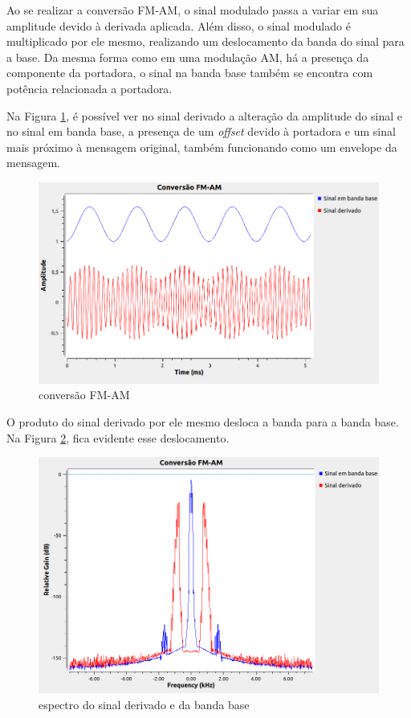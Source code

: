 Ao se realizar a conversão FM-AM, o sinal modulado passa a variar em sua amplitude devido à derivada aplicada. Além disso, o sinal modulado é multiplicado por ele mesmo, realizando um deslocamento da banda do sinal para a base. Da mesma forma como em uma modulação AM, há a presença da componente da portadora, o sinal na banda base também se encontra com potência relacionada a portadora.

Na Figura \ref{fig:resul_03}, é possível ver no sinal derivado a alteração da amplitude do sinal e no sinal em banda base, a presença de um \textit{offset} devido à portadora e um sinal mais próximo à mensagem original, também funcionando como um envelope da mensagem. 

\begin{figure}[!htb]
    \centering
    \includegraphics[width=1\linewidth]{Imagens/fig:resul_03.png}
    \caption{conversão FM-AM}
    \label{fig:resul_03}
\end{figure}

O produto do sinal derivado por ele mesmo desloca a banda para a banda base. Na Figura \ref{fig:resul_04}, fica evidente esse deslocamento. 

\begin{figure}[!htb]
    \centering
    \includegraphics[width=1\linewidth]{Imagens/fig:resul_04.png}
    \caption{espectro do sinal derivado e da banda base}
    \label{fig:resul_04}
\end{figure}

